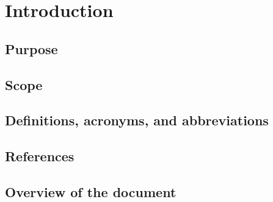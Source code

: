 \chapter{Introduction}


\section{Purpose}
\lipsum[1]


\section{Scope}
\lipsum[2]


\section{Definitions, acronyms, and abbreviations}
\lipsum[3]

\section{References}
\lipsum[4]


\section{Overview of the document}	
\lipsum[5]
